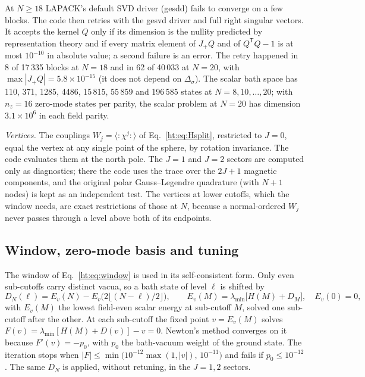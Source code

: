 At $N\geq18$ LAPACK's default SVD driver (gesdd) fails to converge on a few blocks. The code then retries with the
gesvd driver and full right singular vectors. It accepts the kernel $Q$ only if its dimension is the nullity
predicted by representation theory and if every matrix element of $J_+Q$ and of $Q^{\mathsf T}Q-1$ is at most
$10^{-10}$ in absolute value; a second failure is an error. The retry happened in 8 of 17\,335 blocks at $N=18$ and
in 62 of 40\,033 at $N=20$, with $\max|J_+Q|=5.8\times10^{-15}$ %
(it does not depend on $\Delta_\sigma$). The scalar bath space has 110, 371, 1285, 4486, 15\,815, 55\,859 and
196\,585 states at $N=8,10,\dots,20$; %
with $n_z=16$ zero-mode states per parity, the scalar problem at $N=20$ has dimension $3.1\times10^6$ in each field
parity.

\textit{Vertices.} The couplings $W_j=\langle{:}\chi^j{:}\rangle$ of Eq.~\eqref{ht:eq:Hsplit}, restricted to $J=0$,
equal the vertex at any single point of the sphere, by rotation invariance. The code evaluates them at the north
pole. The $J=1$ and $J=2$ sectors are computed only as diagnostics; there the code uses the trace over the $2J+1$
magnetic components, and the original polar Gauss--Legendre quadrature (with $N+1$ nodes) is kept as an independent
test. The vertices at lower cutoffs, which the window needs, are exact restrictions of those at $N$, because a
normal-ordered $W_j$ never passes through a level above both of its endpoints.

\subsection{Window, zero-mode basis and tuning}\label{ht:d3:window}

The window of Eq.~\eqref{ht:eq:window} is used in its self-consistent form. Only even sub-cutoffs carry distinct
vacua, so a bath state of level $\ell$ is shifted by
\begin{equation}
 D_N(\ell)=E_v(N)-E_v\big(2\lfloor(N-\ell)/2\rfloor\big),\qquad E_v(M)=\lambda_{\min}\big[H(M)+D_M\big],\quad E_v(0)=0 ,
 \label{ht:d3:window-floor}
\end{equation}
with $E_v(M)$ the lowest field-even scalar energy at sub-cutoff $M$, solved one sub-cutoff after the other. At each
sub-cutoff the fixed point $v=E_v(M)$ solves $F(v)=\lambda_{\min}[H(M)+D(v)]-v=0$. Newton's method converges on it
because $F'(v)=-p_0$, with $p_0$ the bath-vacuum weight of the ground state. The iteration stops when
$|F|\leq\min\big(10^{-12}\max(1,|v|),\,10^{-11}\big)$ and fails if $p_0\leq10^{-12}$. The same $D_N$ is applied,
without retuning, in the $J=1,2$ sectors.

